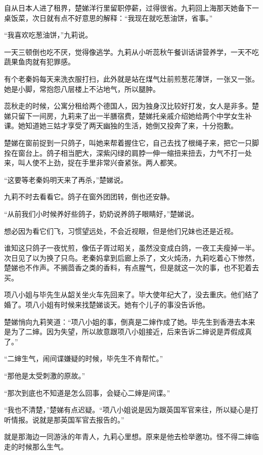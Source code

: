 \par 自从日本人进了租界，楚娣洋行里留职停薪，过得很省。九莉回上海那天她备下一桌饭菜，次日就有点不好意思的解释：“我现在就吃葱油饼，省事。”
\par “我喜欢吃葱油饼，”九莉说。
\par 一天三顿倒也吃不厌，觉得像逃学。九莉从小听蕊秋午餐训话讲营养学，一天不吃蔬果鱼肉就有犯罪感。
\par 有个老秦妈每天来洗衣服打扫，此外就是站在煤气灶前煎葱花薄饼，一张又一张。她是小脚，常抱怨八层楼上不沾地气，所以腿肿。
\par 蕊秋走的时候，公寓分租给两个德国人，因为独身汉比较好打发，女人是非多。楚娣只留下一间房，九莉来了出一半膳宿费，楚娣托亲戚介绍她给两个中学女生补课。她知道她三姑才享受了两天幽独的生活，她倒又投奔了来，十分抱歉。
\par 楚娣在窗前捉到一只鸽子，叫她来帮着握住它，自己去找了根绳子来，把它一只脚拴在窗台上。鸽子相当肥大，深紫闪绿的肩脖一伸一缩扭来扭去，力气不打一处来，叫人使不上劲，捉在手里非常兴奋紧张。两人都笑。
\par “这要等老秦妈明天来了再杀，”楚娣说。
\par 九莉不时去看看它。鸽子在窗外团团转，倒也还安静。
\par “从前我们小时候养好些鸽子，奶奶说养鸽子眼睛好，”楚娣说。
\par 想必因为看它们飞，习惯望远处，不会近视眼，但是他们兄妹也还是近视。
\par 谁知这只鸽子一夜忧煎，像伍子胥过昭关，虽然没变成白鸽，一夜工夫瘦掉一半。次日见了以为换了只鸟。老秦妈拿到后廊上杀了，文火炖汤，九莉吃着心下惨然，楚娣也不作声。不搁茴香之类的香料，有点腥气，但是就这一次的事，也不犯着去买。
\par 项八小姐与毕先生从韶关坐火车先回来了。毕大使年纪大了，没去重庆。他们结了婚了。项八小姐有时候来找楚娣谈天。她有个儿子的事没告诉他。
\par 楚娣悄向九莉笑道：“项八小姐的事，倒真是二婶作成了她。毕先生到香港去本来是为了二婶。因为失望，所以故意跟项八小姐接近，后来告诉二婶说是弄假成真了。”
\par “二婶生气，闹间谍嫌疑的时候，毕先生不肯帮忙。”
\par “那他是太受刺激的原故。”
\par “那次到底也不知道是怎么回事，会疑心二婶是间谍。”
\par “我也不清楚，”楚娣有点迟疑。“项八小姐说是因为跟英国军官来往，所以疑心是打听情报。说就是那英国军官去报告的。”
\par 就是那海边一同游泳的年青人，九莉心里想。原来是他去检举邀功。怪不得二婶临走的时候那么生气。
